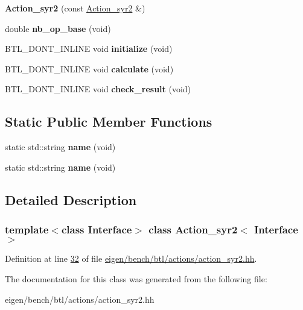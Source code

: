 \begin{DoxyCompactItemize}
{\bfseries Action\+\_\+syr2} (const \hyperlink{class_action__syr2}{Action\+\_\+syr2} \&)
\item 
\mbox{\label{class_action__syr2_a1cb3df321cd156d78617a51612b4c1d8}} 
double {\bfseries nb\+\_\+op\+\_\+base} (void)
\item 
\mbox{\label{class_action__syr2_ac2d981057caebb2d851e8015cbc92b33}} 
B\+T\+L\+\_\+\+D\+O\+N\+T\+\_\+\+I\+N\+L\+I\+NE void {\bfseries initialize} (void)
\item 
\mbox{\label{class_action__syr2_a2eaf718241551433942ab7d781e7e23e}} 
B\+T\+L\+\_\+\+D\+O\+N\+T\+\_\+\+I\+N\+L\+I\+NE void {\bfseries calculate} (void)
\item 
\mbox{\label{class_action__syr2_a8957cb1c84dcaf06fb54e28cd366ade0}} 
B\+T\+L\+\_\+\+D\+O\+N\+T\+\_\+\+I\+N\+L\+I\+NE void {\bfseries check\+\_\+result} (void)
\end{DoxyCompactItemize}
\subsection*{Static Public Member Functions}
\begin{DoxyCompactItemize}
\item 
\mbox{\label{class_action__syr2_a2ff0841a86b9290f9a369792d7973d64}} 
static std\+::string {\bfseries name} (void)
\item 
\mbox{\label{class_action__syr2_a2ff0841a86b9290f9a369792d7973d64}} 
static std\+::string {\bfseries name} (void)
\end{DoxyCompactItemize}


\subsection{Detailed Description}
\subsubsection*{template$<$class Interface$>$\newline
class Action\+\_\+syr2$<$ Interface $>$}



Definition at line \hyperlink{eigen_2bench_2btl_2actions_2action__syr2_8hh_source_l00032}{32} of file \hyperlink{eigen_2bench_2btl_2actions_2action__syr2_8hh_source}{eigen/bench/btl/actions/action\+\_\+syr2.\+hh}.



The documentation for this class was generated from the following file\+:\begin{DoxyCompactItemize}
\item 
eigen/bench/btl/actions/action\+\_\+syr2.\+hh\end{DoxyCompactItemize}
